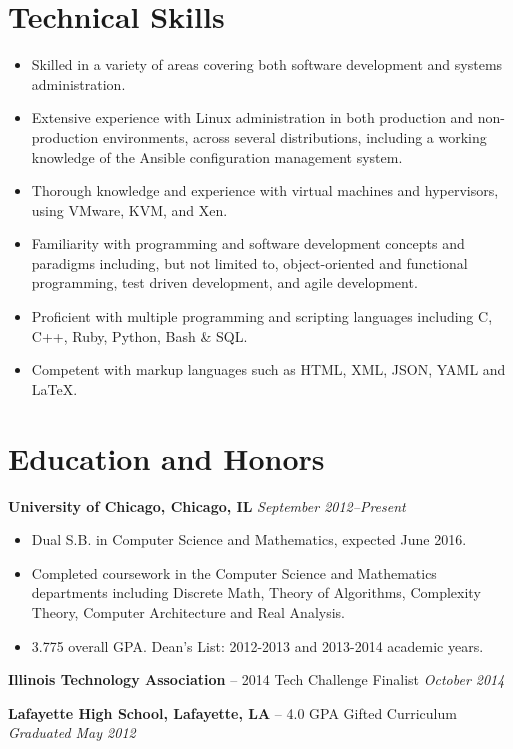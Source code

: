 \documentclass[10pt,letterpaper]{article} %
\begin{document}
    \section*{Technical Skills} 
        \begin{itemize}
        \item Skilled in a variety of areas covering both software development and systems administration. 
        \item Extensive experience with Linux administration in both production and non-production environments, across several distributions, 
        including a working knowledge of the Ansible configuration management system.
        \item Thorough knowledge and experience with virtual machines and hypervisors, using VMware, KVM, and Xen. 
        \item Familiarity with programming and software development concepts and paradigms including, but not limited to, 
        object-oriented and functional programming, test driven development, and agile development.
        \item Proficient with multiple programming and scripting languages including C, C++, Ruby, Python, Bash \& SQL.
        \item Competent with markup languages such as HTML, XML, JSON, YAML and \LaTeX.
        \end{itemize}          
    \section*{Education and Honors}
        \textbf{University of Chicago, Chicago, IL} \hfill \textit{ September 2012--Present } 
        \begin{itemize} 
            \item Dual S.B. in Computer Science and Mathematics, expected June 2016. 
            \item Completed coursework in the Computer Science and Mathematics departments including Discrete Math, Theory of Algorithms, Complexity Theory, Computer Architecture and Real Analysis.  
            \item 3.775 overall GPA. Dean's List: 2012-2013 and 2013-2014 academic years. 
        \end{itemize}
        \textbf{Illinois Technology Association} -- 2014 Tech Challenge Finalist \hfill \textit{October 2014} 

        \textbf{Lafayette High School, Lafayette, LA} -- 4.0 GPA Gifted Curriculum \hfill \textit{Graduated May 2012 } 
\end{document}
